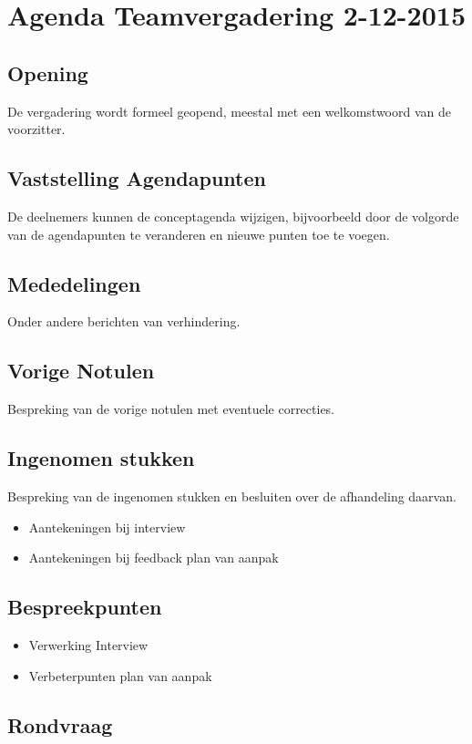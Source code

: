 \documentclass[dutch]{hu}
\subtitle{Agenda Teamvergadering \vergaderingDatum}
\def \vergaderingDatum{2-12-2015}
\begin{document}
\maketitle
\pagestyle{plain}
\chapter{Agenda Teamvergadering \vergaderingDatum}
\section{Opening}
De vergadering wordt formeel geopend, meestal met een welkomstwoord van de voorzitter.

\section{Vaststelling Agendapunten}
De deelnemers kunnen de conceptagenda wijzigen, bijvoorbeeld door de volgorde van de agendapunten te veranderen en nieuwe punten toe te voegen.

\section{Mededelingen}
Onder andere berichten van verhindering.

\section{Vorige Notulen}
Bespreking van de vorige notulen met eventuele correcties.

\section{Ingenomen stukken}
Bespreking van de ingenomen stukken en besluiten over de afhandeling daarvan.
\begin{itemize}
\item Aantekeningen bij interview
\item Aantekeningen bij feedback plan van aanpak
\end{itemize}

\section{Bespreekpunten}
\begin{itemize}
\item Verwerking Interview
\item Verbeterpunten plan van aanpak
\end{itemize}

\section{Rondvraag}
\end{document}
